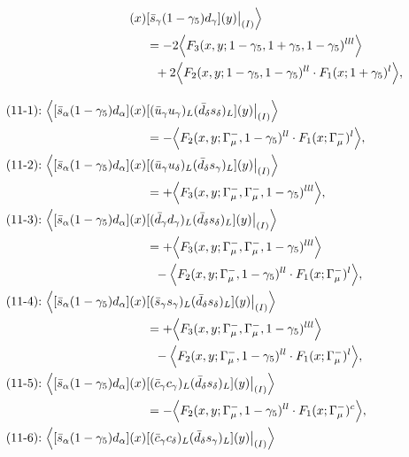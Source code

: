 \begin{align}
[(\bar s_\alpha d_\beta)_L(\bar u_\beta u_\alpha)_R](x)&
[\bar s_\gamma (1 - \gamma_5) d_\gamma](y)\big|_{(I)}
\Big\rangle
\notag\\*
&=
-2\Big\langle F_3(x,y;1-\gamma_5,1+\gamma_5,1-\gamma_5)^{lll}\Big\rangle
\notag\\*&\ \ 
 + 2\Big\langle F_2(x,y;1-\gamma_5,1-\gamma_5)^{ll} \cdot F_1(x;1+\gamma_5)^l\Big\rangle,
\\[3mm]
\mbox{(11-1):}\ 
\Big\langle
[\bar s_\alpha (1 - \gamma_5) d_\alpha](x)&
[(\bar u_\gamma u_\gamma)_L(\bar d_\delta s_\delta)_L](y)\big|_{(I)}
\Big\rangle
\notag\\*
&=
 - \Big\langle F_2(x,y;\Gamma_\mu^-,1-\gamma_5)^{ll} \cdot F_1(x;\Gamma_\mu^-)^l\Big\rangle,
\\
\mbox{(11-2):}\ 
\Big\langle
[\bar s_\alpha (1 - \gamma_5) d_\alpha](x)&
[(\bar u_\gamma u_\delta)_L(\bar d_\delta s_\gamma)_L](y)\big|_{(I)}
\Big\rangle
\notag\\*
&=
 + \Big\langle F_3(x,y;\Gamma_\mu^-,\Gamma_\mu^-,1-\gamma_5)^{lll}\Big\rangle,
\\
\mbox{(11-3):}\ 
\Big\langle
[\bar s_\alpha (1 - \gamma_5) d_\alpha](x)&
[(\bar d_\gamma d_\gamma)_L(\bar d_\delta s_\delta)_L](y)\big|_{(I)}
\Big\rangle
\notag\\*
&=
 + \Big\langle F_3(x,y;\Gamma_\mu^-,\Gamma_\mu^-,1-\gamma_5)^{lll}\Big\rangle
\notag\\*&\ \ 
 - \Big\langle F_2(x,y;\Gamma_\mu^-,1-\gamma_5)^{ll} \cdot F_1(x;\Gamma_\mu^-)^l\Big\rangle,
\\
\mbox{(11-4):}\ 
\Big\langle
[\bar s_\alpha (1 - \gamma_5) d_\alpha](x)&
[(\bar s_\gamma s_\gamma)_L(\bar d_\delta s_\delta)_L](y)\big|_{(I)}
\Big\rangle
\notag\\*
&=
 + \Big\langle F_3(x,y;\Gamma_\mu^-,\Gamma_\mu^-,1-\gamma_5)^{lll}\Big\rangle
\notag\\*&\ \ 
 - \Big\langle F_2(x,y;\Gamma_\mu^-,1-\gamma_5)^{ll} \cdot F_1(x;\Gamma_\mu^-)^l\Big\rangle,
\\
\mbox{(11-5):}\ 
\Big\langle
[\bar s_\alpha (1 - \gamma_5) d_\alpha](x)&
[(\bar c_\gamma c_\gamma)_L(\bar d_\delta s_\delta)_L](y)\big|_{(I)}
\Big\rangle
\notag\\*
&=
 - \Big\langle F_2(x,y;\Gamma_\mu^-,1-\gamma_5)^{ll} \cdot F_1(x;\Gamma_\mu^-)^c\Big\rangle,
\\
\mbox{(11-6):}\ 
\Big\langle
[\bar s_\alpha (1 - \gamma_5) d_\alpha](x)&
[(\bar c_\gamma c_\delta)_L(\bar d_\delta s_\gamma)_L](y)\big|_{(I)}
\Big\rangle
\notag\\*

\end{align}
